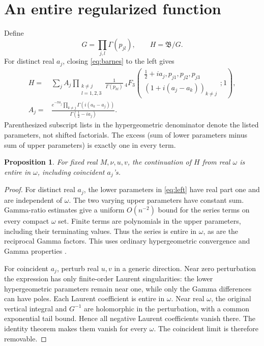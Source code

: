\documentclass[11pt,a4paper]{article}
\newtheorem{proposition}{Proposition}
\newcommand{\B}{\mathfrak B}
\begin{document}
\section{An entire regularized function}
Define
\begin{equation}
G=\prod_{j,l}\Gamma(p_{jl}),\qquad H=\B/G .
\end{equation}
For distinct real \(a_j\), closing \eqref{eq:barnes} to the left gives
\begin{align}
H={}&\sum_j A_j
\prod_{\substack{k\ne j\\l=1,2,3}}\frac1{\Gamma(p_{kl})}\,
{}_4F_3\left(\begin{matrix}
\tfrac12+ia_j,p_{j1},p_{j2},p_{j3}\\
(1+i(a_j-a_k))_{k\ne j}
\end{matrix};1\right),\label{eq:left}\\
A_j={}&
\frac{e^{-\pi a_j}\prod_{k\ne j}\Gamma(i(a_k-a_j))}
{\Gamma(\tfrac12-ia_j)} .
\end{align}
Parenthesized subscript lists in the hypergeometric denominator
denote the listed parameters, not shifted factorials.
The excess (sum of lower parameters minus sum of upper parameters)
is exactly one in every term.

\begin{proposition}
For fixed real \(M,\nu,u,v\), the continuation of \(H\) from real
\(\omega\) is entire in \(\omega\), including coincident \(a_j\)'s.
\end{proposition}
\begin{proof}
For distinct real \(a_j\), the lower parameters in \eqref{eq:left}
have real part one and are independent of \(\omega\).
The two varying upper parameters have constant sum.
Gamma-ratio estimates give a uniform \(O(n^{-2})\) bound for the
series terms on every compact \(\omega\) set. Finite terms are
polynomials in the upper parameters, including their terminating
values. Thus the series is entire in \(\omega\), as are the reciprocal
Gamma factors. This uses ordinary hypergeometric convergence and
Gamma properties \cite{dlmf16,dlmf5}.

For coincident \(a_j\), perturb real \(u,v\) in a generic direction.
Near zero perturbation the expression has only finite-order
Laurent singularities: the lower hypergeometric parameters remain
near one, while only the Gamma differences can have poles.
Each Laurent coefficient is entire in \(\omega\).
Near real \(\omega\), the original vertical integral and \(G^{-1}\)
are holomorphic in the perturbation, with a common exponential
tail bound. Hence all negative Laurent coefficients vanish there.
The identity theorem makes them vanish for every \(\omega\).
The coincident limit is therefore removable.
\end{proof}
\end{document}
